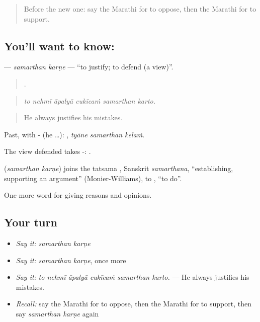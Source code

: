 \label{lesson:MR-C347-samarthan-karne}



\begin{quote}
Before the new one: say the Marathi for to oppose, then the Marathi for to support.
\end{quote}

\subsection*{You'll want to know:  }
\textbf{ } — \emph{samarthan karṇe} — \textquotedblleft{}to justify; to defend (a view)\textquotedblright{}.

\begin{quote}
     .
\end{quote}

\begin{quote}
\emph{to nehmī āpalyā cukīcaṁ samarthan karto.}
\end{quote}

\begin{quote}
He always justifies his mistakes.
\end{quote}

Past, with - (he …):   , \emph{tyāne samarthan kelaṁ}.

The view defended takes -:   .

\begin{cousinweb}
\textbf{ } (\emph{samarthan karṇe}) joins the tatsama , Sanskrit \emph{samarthana}, \textquotedblleft{}establishing, supporting an argument\textquotedblright{} (Monier-Williams), to , \textquotedblleft{}to do\textquotedblright{}.
\end{cousinweb}

\begin{grammarlens}[title={What you've built}]
One more word for giving reasons and opinions.
\end{grammarlens}

\subsection*{Your turn}
\begin{itemize}
\raggedright
  \item \emph{Say it:} \emph{samarthan karṇe}
  \item \emph{Say it:} \emph{samarthan karṇe}, once more
  \item \emph{Say it:} \emph{to nehmī āpalyā cukīcaṁ samarthan karto.} — He always justifies his mistakes.
  \item \emph{Recall:} say the Marathi for to oppose, then the Marathi for to support, then say \emph{samarthan karṇe} again
\end{itemize}

